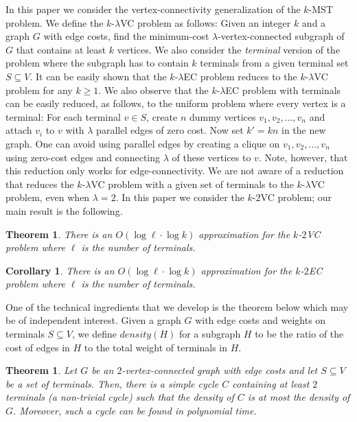 \documentclass[11pt]{article}
\newtheorem{theorem}[lemma]{Theorem}
\newtheorem{corollary}[lemma]{Corollary}
\newcommand{\kec}[1]{$k$-$#1${\sc EC} }
\newcommand{\kvc}[1]{$k$-$#1${\sc VC} }
\newcommand{\ke}{\kec{2}}
\newcommand{\kv}{\kvc{2}}
\begin{document}
In this paper we consider the vertex-connectivity generalization of
the $k$-MST problem. We define the \kvc{\lambda} problem as follows:
Given an integer $k$ and a graph $G$ with edge costs, find the
minimum-cost $\lambda$-vertex-connected subgraph of $G$ that contains
at least $k$ vertices. We also consider the {\em terminal} version of
the problem where the subgraph has to contain $k$ terminals from a
given terminal set $S \subseteq V$. It can be easily shown that the
\kec{\lambda} problem reduces to the \kvc{\lambda} problem for any $k
\ge 1$. We also observe that the \kec{\lambda} problem with terminals
can be easily reduced, as follows, to the uniform problem where every
vertex is a terminal: For each terminal $v \in S$, create $n$ dummy
vertices $v_1, v_2, \ldots, v_n$ and attach $v_i$ to $v$ with
$\lambda$ parallel edges of zero cost. Now set $k'= kn$ in the new
graph. One can avoid using parallel edges by creating a clique on
$v_1, v_2, \ldots, v_n$ using zero-cost edges and connecting $\lambda$
of these vertices to $v$. Note, however, that this reduction only
works for edge-connectivity. We are not aware of a reduction that
reduces the \kvc{\lambda} problem with a given set of terminals to the
\kvc{\lambda} problem, even when $\lambda=2$. In this paper we
consider the \kv problem; our main result is the following.

\begin{theorem}
  \label{thm:kv}
  There is an $O(\log \ell \cdot \log k)$ approximation for the \kv
  problem where $\ell$ is the number of terminals.
\end{theorem}

\begin{corollary}
  \label{cor:ke}
  There is an $O(\log \ell \cdot \log k)$ approximation for the \ke
  problem where $\ell$ is the number of terminals.
\end{corollary}

One of the technical ingredients that we develop is the theorem below
which may be of independent interest. Given a graph $G$ with edge costs
and weights on terminals $S \subseteq V$, we define $density(H)$ for a
subgraph $H$ to be the ratio of the cost of edges in $H$ to the total
weight of terminals in $H$.

\begin{theorem}
  \label{thm:cycle}
  Let $G$ be an $2$-vertex-connected graph with edge costs and let $S
  \subseteq V$ be a set of terminals. Then, there is a simple cycle $C$
  containing at least $2$ terminals (a non-trivial cycle) such that
  the density of $C$ is at most the density of $G$. Moreover, such a
  cycle can be found in polynomial time.
\end{theorem}
\end{document}
